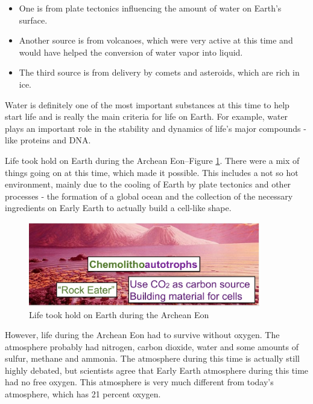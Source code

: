 \documentclass[]{article}
\begin{document}
\begin{itemize}
	\item One is from plate tectonics influencing the amount of water on Earth's surface.

	\item Another source is from volcanoes, which were very active at this time
	and would have helped the conversion of water vapor into liquid.

	\item The third source is from delivery by comets and asteroids,
	which are rich in ice.

\end{itemize}

Water is definitely one of the most
important substances
at this time to help start life
and is really the main criteria
for life on Earth.
For example,
water plays an important role
in the stability and dynamics
of life's major compounds -
like proteins and DNA.

Life took hold on Earth during the Archean Eon--Figure \ref{fig:Chemolithoautotrophs}. There were a mix of things going on
at this time,
which made it possible.
This includes a not so hot environment,
mainly due to the cooling of Earth
by plate tectonics and other processes -
the formation of a global ocean
and the collection of the necessary
ingredients on Early Earth
to actually build a cell-like shape.
\begin{figure}[H]
	\caption{Life took hold on Earth during the Archean Eon} \label{fig:Chemolithoautotrophs}
	\includegraphics[width=0.9\textwidth]{Chemolithoautotrophs}
\end{figure}



However, life during the Archean Eon
had to survive without oxygen.
The atmosphere probably had nitrogen,
carbon dioxide, water
and some amounts of sulfur,
methane and ammonia.
The atmosphere during this time
is actually still highly debated,
but scientists agree
that Early Earth atmosphere
during this time had no free oxygen.
This atmosphere is very much different
from today's atmosphere,
which has 21 percent oxygen.
\end{document}
